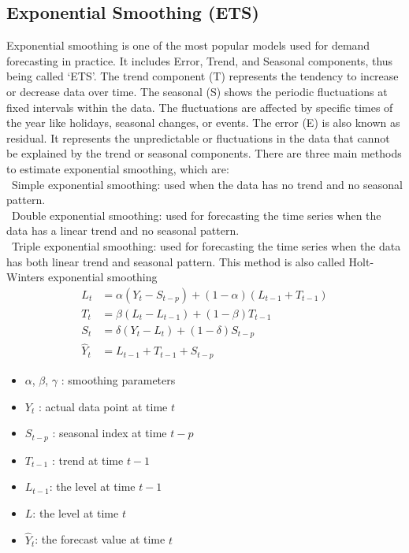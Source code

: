 \documentclass{ieeeojies}
\begin{document}
\subsection{Exponential Smoothing (ETS)}
Exponential smoothing is one of the most popular models used for demand forecasting in practice. It includes Error, Trend, and Seasonal components, thus being called ‘ETS’.
The trend component (T) represents the tendency to increase or decrease data over time. The seasonal (S) shows the periodic fluctuations at fixed intervals within the data. The fluctuations are affected by specific times of the year like holidays, seasonal changes, or events. The error (E) is also known as residual. It represents the unpredictable or fluctuations in the data that cannot be explained by the trend or seasonal components.
There are three main methods to estimate exponential smoothing, which are: \\
    \indent\textbullet\ Simple exponential smoothing: used when the data has no trend and no seasonal pattern. \\
    \indent\textbullet\ Double exponential smoothing: used for forecasting the time series when the data has a linear trend and no seasonal pattern. \\
    \indent\textbullet\ Triple exponential smoothing: used for forecasting the time series when the data has both linear trend and seasonal pattern. This method is also called Holt-Winters exponential smoothing \cite{ets_triple}
    \begin{align*}
        L_t &= \alpha(Y_t - S_{t-p}) + (1 - \alpha)(L_{t-1} + T_{t-1}) \\
        T_t &= \beta(L_t - L_{t-1}) + (1 - \beta)T_{t-1} \\
        S_t &= \delta(Y_t - L_t) + (1 - \delta)S_{t-p} \\
        \hat{Y}_t &= L_{t-1} + T_{t-1} + S_{t-p}
    \end{align*} 
    \begin{itemize}
      \item $\alpha$, $\beta$, $\gamma$ : smoothing parameters
      \item $Y_t$ : actual data point at time $t$
      \item $S_{t-p}$ : seasonal index at time $t-p$
      \item $T_{t-1}$ : trend at time $t-1$
      \item $L_{t-1}$: the level at time $t-1$
      \item $L$: the level at time $t$
      \item $\hat{Y}_t$: the forecast value at time $t$ \cite{ets_triple_formula}
    \end{itemize}
\end{document}
